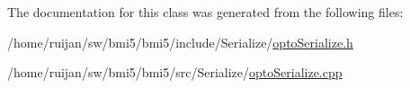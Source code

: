 The documentation for this class was generated from the following files\-:\begin{DoxyCompactItemize}
\item 
/home/ruijan/sw/bmi5/bmi5/include/\-Serialize/\hyperlink{optoSerialize_8h}{opto\-Serialize.\-h}\item 
/home/ruijan/sw/bmi5/bmi5/src/\-Serialize/\hyperlink{optoSerialize_8cpp}{opto\-Serialize.\-cpp}\end{DoxyCompactItemize}
